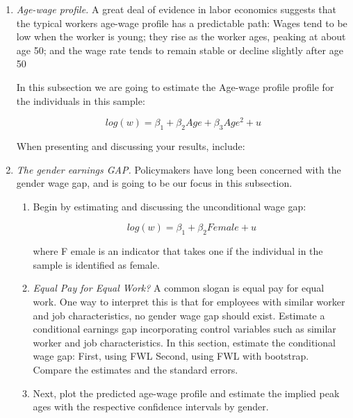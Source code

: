 \documentclass[12pt,a4paper,onecolumn]{article}
\begin{document}
\begin{enumerate}
\begin{enumerate}
    

\end{enumerate}

 
    \item \textit{Age-wage profile.} A great deal of evidence in labor economics suggests that the typical workers age-wage profile has a predictable path: Wages tend to be low when the worker is young; they rise as the worker ages, peaking at about age 50; and the wage rate tends to remain stable or decline slightly after age 50

    In this subsection we are going to estimate the Age-wage profile profile for the individuals in this sample:

    \begin{equation}
    log(w) = \beta_{1} +\beta_{2}Age + \beta_{3}Age^{2} + u
    \end{equation}

    When presenting and discussing your results, include:


    \item \textit{The gender earnings GAP.} Policymakers have long been concerned with the gender wage gap, and is going to be our focus in this subsection.

    \begin{enumerate}
    \item Begin by estimating and discussing the unconditional wage gap:
    
    \begin{equation}
    log(w) = \beta_{1} +\beta_{2}Female  + u
    \end{equation}

    where F emale is an indicator that takes one if the individual in the sample is identified as female.



    
    \item \textit{Equal Pay for Equal Work?} A common slogan is equal pay for equal work. One way to interpret this is that for employees with similar worker and job characteristics, no gender wage gap should exist. Estimate a conditional earnings gap incorporating control variables such as similar worker and job characteristics. In this section, estimate the conditional wage gap:
    First, using FWL
    Second, using FWL with bootstrap. Compare the estimates and the standard errors.

    \item Next, plot the predicted age-wage profile and estimate the implied peak ages with the respective confidence intervals by gender.
    


\end{enumerate}
\end{enumerate}
\end{document}
